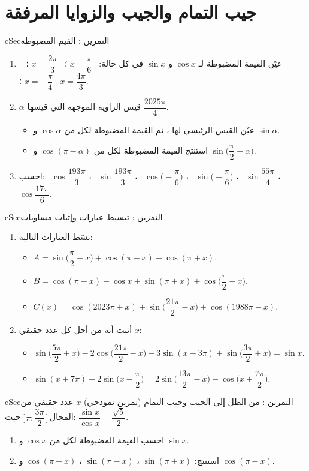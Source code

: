 \documentclass[12pt,a4paper]{article}
\newenvironment{BOX}[2]{\begin{otherlanguage}{english}\begin{arbox}{#1}{#2}}{\end{arbox}\end{otherlanguage}}
\newcounter{exo}
\newenvironment{tamrin}[1]{\stepcounter{exo}\begin{BOX}{cSec}{التمرين \theexo: #1}}{\end{BOX}}
\newenvironment{sq}{\begin{itemize}[leftmargin=2.4em,itemsep=3pt]}{\end{itemize}}
\newcommand{\qa}{\item[(أ)]}\newcommand{\qb}{\item[(ب)]}\newcommand{\qc}{\item[(جـ)]}\newcommand{\qd}{\item[(د)]}\newcommand{\qe}{\item[(هـ)]}
\begin{document}
\section{جيب التمام والجيب والزوايا المرفقة}
\begin{tamrin}{القيم المضبوطة}
\begin{enumerate}
\item عيّن القيمة المضبوطة لـ $\cos x$ و $\sin x$ في كل حالة: \ $x=\dfrac{\pi}{6}$ ؛ \ $x=\dfrac{2\pi}{3}$ ؛ \ $x=-\dfrac{\pi}{4}$ ؛ \ $x=\dfrac{4\pi}{3}$.
\item $\alpha$ قيس الزاوية الموجهة التي قيسها $\dfrac{2025\pi}{4}$.
\begin{sq}
\qa عيّن القيس الرئيسي لها ، ثم القيمة المضبوطة لكل من $\cos\alpha$ و $\sin\alpha$.
\qb استنتج القيمة المضبوطة لكل من $\cos(\pi-\alpha)$ و $\sin\Big(\dfrac{\pi}{2}+\alpha\Big)$.
\end{sq}
\item احسب: \ $\cos\dfrac{193\pi}{3}$ ، \ $\sin\dfrac{193\pi}{3}$ ، \ $\cos\Big(-\dfrac{\pi}{6}\Big)$ ، \ $\sin\Big(-\dfrac{\pi}{6}\Big)$ ، \ $\sin\dfrac{55\pi}{4}$ ، \ $\cos\dfrac{17\pi}{6}$.
\end{enumerate}
\end{tamrin}

\begin{tamrin}{تبسيط عبارات وإثبات مساويات}
\begin{enumerate}
\item بسّط العبارات التالية:
\begin{sq}
\qa $A=\sin\Big(\dfrac{\pi}{2}-x\Big)+\cos(\pi-x)+\cos(\pi+x)$.
\qb $B=\cos(\pi-x)-\cos x+\sin(\pi+x)+\cos\Big(\dfrac{\pi}{2}-x\Big)$.
\qc $C(x)=\cos(2023\pi+x)+\sin\Big(\dfrac{21\pi}{2}-x\Big)+\cos(1988\pi-x)$.
\end{sq}
\item أثبت أنه من أجل كل عدد حقيقي $x$:
\begin{sq}
\qa $\sin\Big(\dfrac{5\pi}{2}+x\Big)-2\cos\Big(\dfrac{21\pi}{2}-x\Big)-3\sin(x-3\pi)+\sin\Big(\dfrac{3\pi}{2}+x\Big)=\sin x$.
\qb $\sin(x+7\pi)-2\sin\Big(x-\dfrac{\pi}{2}\Big)=2\sin\Big(\dfrac{13\pi}{2}-x\Big)-\cos\Big(x+\dfrac{7\pi}{2}\Big)$.
\end{sq}
\end{enumerate}
\end{tamrin}

\begin{tamrin}{من الظل إلى الجيب وجيب التمام (تمرين نموذجي)}
$x$ عدد حقيقي من المجال $\Big]\pi;\dfrac{3\pi}{2}\Big[$ حيث: $\dfrac{\sin x}{\cos x}=\dfrac{\sqrt5}{2}$.
\begin{enumerate}
\item احسب القيمة المضبوطة لكل من $\cos x$ و $\sin x$.
\item استنتج: $\sin(\pi+x)$ ، $\sin(\pi-x)$ ، $\cos(\pi+x)$ و $\cos(\pi-x)$.
\end{enumerate}
\end{tamrin}
\end{document}
